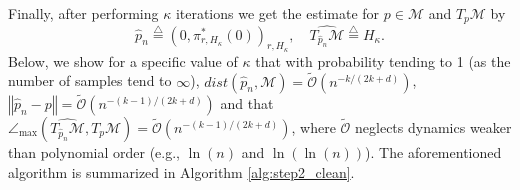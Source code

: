 \documentclass[12pt]{article}
\theoremstyle{remark}
\newcommand{\MM}{\mathcal{M}}
\newcommand{\defeq}{\stackrel{\bigtriangleup}{=}}
\newcommand{\norm}[1]{\left\Vert #1 \right\Vert}
\newcommand{\wtilde}[1]{\widetilde{#1}}
\newcommand{\maxangle}{\angle_{\max}}
\begin{document}
Finally, after performing $\kappa$ iterations we get the estimate for $ p\in \MM$ and $ T_{ p}\MM $ by 
\begin{equation}
	\hat p_n \defeq (0, \pi^*_{r, H_\kappa}(0))_{r, H_\kappa} ,\quad \widehat{T_{\hat p_n}\MM} \defeq H_\kappa
	.\end{equation}
Below, we show for a specific value of $\kappa$ that with probability tending to 1 (as the number of samples tend to $\infty$), $dist(\hat p_n,\MM) = \wtilde{\mathcal{O}}(n^{-k/(2k+d)})$, $ \norm{\hat p_n -  p} =  \wtilde{\mathcal{O}}(n^{-(k-1)/(2k+d)}) $ and that $ \maxangle(\widehat{T_{\hat p_n}\MM}, T_{ p}\MM) = \wtilde{\mathcal{O}}(n^{-(k-1)/(2k+d)}) $, where $ \wtilde{\mathcal{O}} $ neglects dynamics weaker than polynomial order (e.g., $ \ln(n) $ and $ \ln(\ln(n)) $). The aforementioned algorithm is summarized in Algorithm \ref{alg:step2_clean}.
\end{document}
